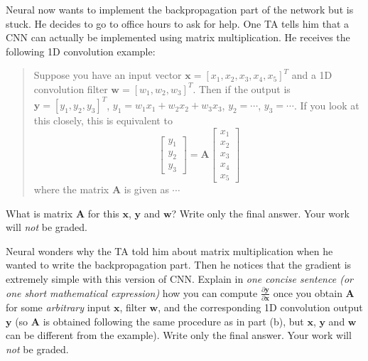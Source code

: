 \documentclass[11pt,addpoints,answers]{exam}
\newcommand{\wv}{\mathbf{w}}
\newcommand{\xv}{\mathbf{x}}
\newcommand{\yv}{\mathbf{y}}
\newcommand{\Av}{\mathbf{A}}
\begin{document}
\begin{questions}
\begin{parts}
\begin{subparts}
\subpart[2] Neural now wants to implement the backpropagation part of the network but is stuck. He decides to go to office hours to ask for help. One TA tells him that a CNN can actually be implemented using matrix multiplication. He receives the following 1D convolution example:
\begin{quote}
    Suppose you have an input vector $\xv = [x_1, x_2, x_3, x_4, x_5]^T$ and a 1D convolution filter $\wv = [w_1, w_2, w_3]^T$. Then if the output is $\yv = [y_1, y_2, y_3]^T$, $y_1 = w_1 x_1 + w_2 x_2 + w_3 x_3$, $y_2 = \cdots$, $y_3 = \cdots$. If you look at this closely, this is equivalent to
    \[
    \begin{bmatrix} y_1 \\ y_2 \\ y_3 \end{bmatrix} = \Av \begin{bmatrix} x_1 \\ x_2 \\ x_3 \\ x_4 \\ x_5 \end{bmatrix}
    \]
    where the matrix $\Av$ is given as $\cdots$
\end{quote}
What is matrix $\Av$ for this $\xv$, $\yv$ and $\wv$? Write only the final answer. Your work will \textit{not} be graded. \\
    \begin{your_solution}[height=5cm]
    
    
    \end{your_solution}

\vspace{5mm}

\subpart[2] Neural wonders why the TA told him about matrix multiplication when he wanted to write the backpropagation part. Then he notices that the gradient is extremely simple with this version of CNN. Explain in \textit{one concise sentence (or one short mathematical expression)} how you can compute $\frac{\partial \yv}{\partial \xv}$ once you obtain $\Av$ for some \textit{arbitrary} input $\xv$, filter $\wv$, and the corresponding 1D convolution output $\yv$ (so $\Av$ is obtained following the same procedure as in part (b), but $\xv$, $\yv$ and $\wv$ can be different from the example). Write only the final answer. Your work will \textit{not} be graded. \\
    \begin{your_solution}[height=2cm]
    

\end{your_solution}
\end{subparts}
\end{parts}
\end{questions}
\end{document}
